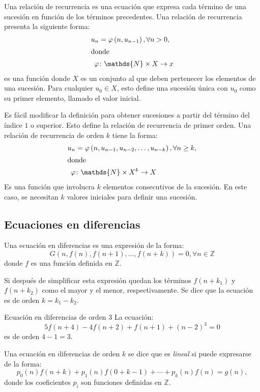 Una relación de recurrencia es una ecuación que expresa cada término de una sucesión en función de los términos precedentes. Una relación de recurrencia presenta la siguiente forma:
\begin{align*}
u_{n}&=\varphi\left(n,u_{n-1}\right),\forall n>0,\\
\intertext{donde}
\varphi&\colon\mathds{N}\times X\rightarrow x
\end{align*}
es una función donde $X$ es un conjunto al que deben pertenecer los elementos de una sucesión. Para cualquier $u_{0}\in X$, esto define una sucesión única con $u_{0}$ como su primer elemento, llamado el valor inicial.

Es fácil modificar la definición para obtener sucesiones a partir del término del índice $1$ o superior. Esto define la relación de recurrencia de primer orden. Una relación de recurrencia de orden $k$ tiene la forma:
\begin{align*}
u_{n}&=\varphi\left(n,u_{n-1},u_{n-2},\ldots,u_{n-k}\right),\forall n\geq k,\\
\intertext{donde}
\varphi&\colon\mathds{N}\times X^{k}\rightarrow X
\end{align*}
Es una función que involucra $k$ elementos consecutivos de la sucesión. En este caso, se necesitan $k$ valores iniciales para definir una sucesión.

\subsection{Ecuaciones en diferencias}
Una ecuación en diferencias es una expresión de la forma: \[ G\left(n,f(n),f(n+1),\ldots,f(n+k)\right)=0,\forall n\in\mathds{Z} \] donde $f$ es una función definida en $\mathds{Z}$.

Si después de simplificar esta expresión quedan los términos $f\left(n+k_{1}\right)$ y $f\left(n+k_{2}\right)$ como el mayor y el menor, respectivamente. Se dice que la ecuación es de orden $k=k_{1}-k_{2}$.
\begin{example}{Ecuación en diferencias de orden $3$}
	La ecuación:
	\begin{equation}
	5f(n+4)-4f(n+2)+f(n+1)+(n-2)^{3}=0
	\end{equation}
	es de orden $4-1=3$.
\end{example}
Una ecuación en diferencias de orden $k$ se dice que es \emph{lineal} si puede expresarse de la forma:
\begin{equation*}
p_{0}(n)f(n+k)+p_{1}(n)f(0+k-1)+\cdots+p_{k}(n)f(n)=g(n),
\end{equation*}
donde los coeficientes $p_{i}$ son funciones definidas en $\mathds{Z}$.


